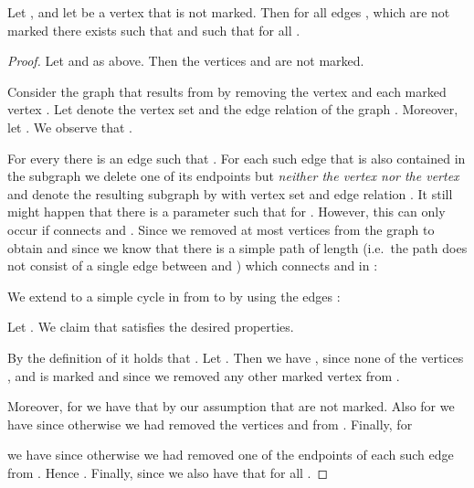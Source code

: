 \documentclass[a4paper,UKenglish]{lipics}
\theoremstyle{plain}
\begin{document}
 
\begin{lemma}\label{lemma:markedstable}
 Let ,  and let  be a 
vertex that is not marked.
 Then for all edges ,  which are not marked 
there exists  such that  and 
such that  for all .
 \end{lemma}
\begin{proof}
Let  and  as above.
Then the vertices  and  are not marked.

Consider the graph  that results from  by removing the vertex 
 and each marked vertex .
Let  denote the vertex set and  
the edge relation of the graph .
Moreover, let  .
We observe that .

For every  there is an edge  such that 
. For each such edge  that is also contained in the 
subgraph  we delete one of its endpoints but \emph{neither 
the vertex  nor the vertex } and denote the resulting subgraph by 
 with vertex set  and edge relation . 
It still might happen that there is a parameter  
such that  for . However, this can only occur if 
 connects  and . 
Since we removed at most  vertices from the graph  to obtain   
and 
since  we know that there is a simple path 
of length  (i.e.\ the path does not consist of a 
single edge between  
and ) which connects  and  in :


\noindent
We extend  to a simple cycle  in  from  to 
 by 
using the edges :

Let . We claim that  satisfies 
the desired properties.

By the definition of  it holds that . 
Let . Then we have , since none of the vertices ,  and
 is marked and since we removed any other marked vertex  
from .

Moreover, for  we have 
that  by our assumption that  are not marked.
Also for  we have  since 
otherwise we had removed the vertices  and  from .
Finally, for
 
we have 
since otherwise we had removed one of the endpoints of each such edge  from 
. Hence . 
Finally, since  we also have that  
for all .
\end{proof}
\end{document}

